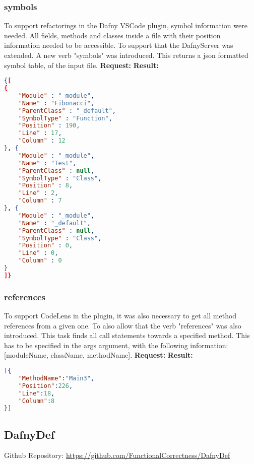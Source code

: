 \subsubsection{symbols}
To support refactorings in the Dafny VSCode plugin, symbol information were needed. All fields, methods and classes inside a file with their position information needed to be accessible. To support that the DafnyServer was extended. A new verb "symbols" was introduced. This returns a json formatted symbol table, of the input file. 
\newline\newline
\textbf{Request: }
\newline\newline
\textbf{Result: }
\begin{lstlisting}[language=json,firstnumber=1]
{[
{
	"Module" : "_module",
	"Name" : "Fibonacci",
	"ParentClass" : "_default",
	"SymbolType" : "Function",
	"Position" : 190,
	"Line" : 17,
	"Column" : 12
}, {
	"Module" : "_module",
	"Name" : "Test",
	"ParentClass" : null,
	"SymbolType" : "Class",
	"Position" : 8,
	"Line" : 2,
	"Column" : 7
}, {
	"Module" : "_module",
	"Name" : "_default",
	"ParentClass" : null,
	"SymbolType" : "Class",
	"Position" : 0,
	"Line" : 0,
	"Column" : 0
}
]}
\end{lstlisting}

\subsubsection{references}
To support CodeLens in the plugin, it was also necessary to get all method references from a given one. To also allow that the verb "references" was also introduced. This task finds all call statements towards a specified method. This has to be specified in the args argument, with the following information: [moduleName, className, methodName]. 
\newline\newline
\textbf{Request: }
\newline\newline
\textbf{Result: }
\begin{lstlisting}[language=json,firstnumber=1]
[{
	"MethodName":"Main3",
	"Position":226,
	"Line":18,
	"Column":8
}] 
\end{lstlisting}


\subsection{DafnyDef}
Github Repository: \href{https://github.com/FunctionalCorrectness/DafnyDef}{https://github.com/FunctionalCorrectness/DafnyDef}

